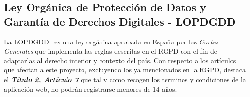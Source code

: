 \subsection{Ley Orgánica de Protección de Datos y Garantía de Derechos Digitales - LOPDGDD}

La LOPDGDD~\cite{lopdgdd2018} es una ley orgánica aprobada en España por las \textit{Cortes Generales} que implementa las reglas descritas en el RGPD con el fín de adaptarlas al derecho interior y contexto del país. Con respecto a los artículos que afectan a este proyecto, excluyendo los ya mencionados en la RGPD, destaca el \textbf{\textit{Título 2, Artículo 7}} que tal y como recogen los terminos y condiciones de la aplicación web, no podrán registrarse menores de 14 años.